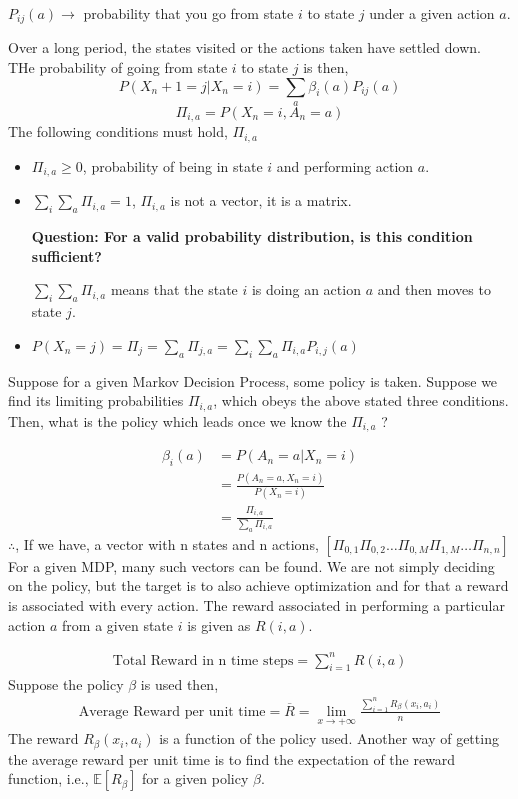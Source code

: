 $P_{ij}(a) \rightarrow$ probability that you go from state $i$ to state $j$ under a given action $a$.

Over a long period, the states visited or the actions taken have settled down. THe probability of going from state $i$ to state $j$ is then,
\begin{equation*}
    P(X_n+1=j|X_n=i)=\sum_a \beta_i(a)P_{ij}(a)
    \end{equation*}
    \begin{equation*}
    \Pi_{i,a}=P(X_n=i, A_n=a)
\end{equation*}
The following conditions must hold, $\Pi_{i,a}$
\begin{itemize}
    \item $\Pi_{i,a} \geq 0$, probability of being in state $i$ and performing action $a$.
    \item $\sum_i \sum_a \Pi_{i,a}=1$, $\Pi_{i,a}$ is not a vector, it is a matrix.
    
\textbf{Question: For a valid probability distribution, is this condition sufficient?}

$\sum_i \sum_a \Pi_{i,a}$ means that the state $i$ is doing an action $a$ and then moves to state $j$.
\item $P(X_n=j)=\Pi_j=\sum_a\Pi_{j,a}=\sum_i \sum_a \Pi_{i,a}P_{i,j}(a)$
\end{itemize}

Suppose for a given Markov Decision Process, some policy is taken. Suppose we find its limiting probabilities $\Pi_{i,a}$, which obeys the above stated three conditions.  Then, what is the policy which leads once we know the $\Pi_{i,a}$ ?

\begin{align*}
    \beta_i(a)&=P(A_n=a|X_n=i)\\
    &=\frac{P(A_n=a,X_n=i)}{P(X_n=i)}\\
    &=\frac{\Pi_{i,a}}{\sum_a\Pi_{i,a}}
\end{align*}
$\therefore$, If we have, a vector with n states and n actions, $[\Pi_{0,1} \Pi_{0,2} \dots \Pi_{0,M} \Pi_{1,M} \dots \Pi_{n,n}]$
For a given MDP, many such vectors can be found. We are not simply deciding on the policy, but the target is to also achieve optimization and for that a reward is associated with every action. The reward associated in performing a particular action $a$ from a given state $i$ is given as $R(i,a)$.

\begin{align*}
    \text{Total Reward in n time steps}=\sum_{i=1}^nR(i,a)
\end{align*}
Suppose the policy $\beta$ is used then,
\begin{align*}
    \text{Average Reward per unit time}=\overline{R}=\lim_{x \to +\infty}\frac{\sum_{i=1}^nR_\beta(x_i,a_i)}{n}
\end{align*}
The reward $R_\beta(x_i,a_i)$ is a function of the policy used. Another way of getting the average reward per unit time is to find the expectation of the reward function, i.e., $\mathbb{E}[R_\beta]$ for a given policy $\beta$.

